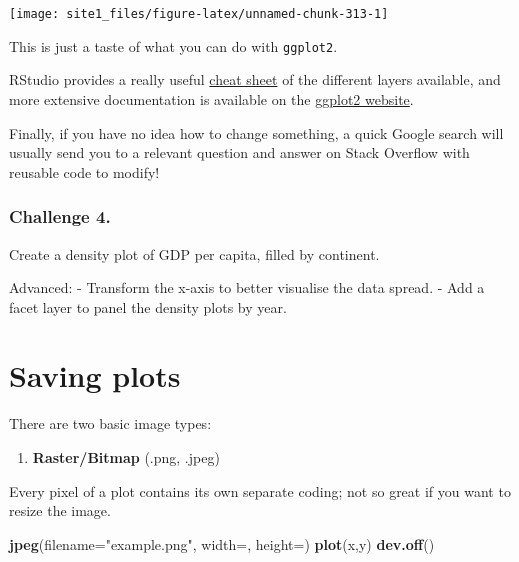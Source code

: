 \documentclass[]{book}
\newenvironment{Shaded}{\begin{snugshade}}{\end{snugshade}}
\newcommand{\DataTypeTok}[1]{\textcolor[rgb]{0.13,0.29,0.53}{#1}}
\newcommand{\KeywordTok}[1]{\textcolor[rgb]{0.13,0.29,0.53}{\textbf{#1}}}
\newcommand{\NormalTok}[1]{#1}
\newcommand{\StringTok}[1]{\textcolor[rgb]{0.31,0.60,0.02}{#1}}
\providecommand{\tightlist}{%
  \setlength{\itemsep}{0pt}\setlength{\parskip}{0pt}}
\begin{document}
\begin{center}\texttt{[image: site1\_files/figure-latex/unnamed-chunk-313-1]} \end{center}

This is just a taste of what you can do with \texttt{ggplot2}.

RStudio provides a really useful \href{https://www.rstudio.com/wp-content/uploads/2015/03/ggplot2-cheatsheet.pdf}{cheat sheet} of the different layers available, and more extensive documentation is available on the \href{http://docs.ggplot2.org/current/}{ggplot2 website}.

Finally, if you have no idea how to change something, a quick Google search will usually send you to a relevant question and answer on Stack Overflow with reusable code to modify!

\hypertarget{challenge-4.-2}{%
\subsubsection*{Challenge 4.}\label{challenge-4.-2}}

Create a density plot of GDP per capita, filled by continent.

Advanced:
- Transform the x-axis to better visualise the data spread.
- Add a facet layer to panel the density plots by year.

\hypertarget{saving-plots}{%
\section{Saving plots}\label{saving-plots}}

There are two basic image types:

\begin{enumerate}
\def\labelenumi{\arabic{enumi})}
\tightlist
\item
  \textbf{Raster/Bitmap} (.png, .jpeg)
\end{enumerate}

Every pixel of a plot contains its own separate coding; not so great if you want to resize the image.

\begin{Shaded}
\begin{Highlighting}[]
\KeywordTok{jpeg}\NormalTok{(}\DataTypeTok{filename=}\StringTok{"example.png"}\NormalTok{, }\DataTypeTok{width=}\NormalTok{, }\DataTypeTok{height=}\NormalTok{)}
\KeywordTok{plot}\NormalTok{(x,y)}
\KeywordTok{dev.off}\NormalTok{()}
\end{Highlighting}
\end{Shaded}
\end{document}
